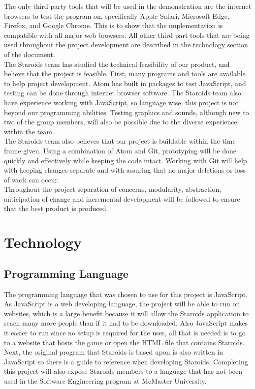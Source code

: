 \documentclass{article}
\begin{document}
The only third party tools that will be used in the demonstration are the internet browsers to test the program on, specifically Apple Safari, Microsoft Edge, Firefox, and Google Chrome. This is to show that the implementation is compatible with all major web browsers. All other third part tools that are being used throughout the project development are described in the \hyperref[technology:ide]{technology section} of the document.\\

The Staroids team has studied the technical feasibility of our product, and believe that the project is feasible. First, many programs and tools are available to help project development. Atom has built in packages to test JavaScript, and testing can be done through internet browser software. The Staroids team also have experience working with JavaScript, so language wise, this project is not beyond our programming abilities. Testing graphics and sounds, although new to two of the group members, will also be possible due to the diverse experience within the team.\\
The Staroids team also believes that our project is buildable within the time frame given. Using a combination of Atom and Git, prototyping will be done quickly and effectively while keeping the code intact. Working with Git will help with keeping changes separate and with assuring that no major deletions or loss of work can occur.\\
Throughout the project separation of concerns, modularity, abstraction, anticipation of change and incremental development will be followed to ensure that the best product is produced.

\section{Technology}
\subsection{Programming Language}
The programming language that was chosen to use for this project is JavaScript. As JavaScript is a web developing language, the project will be able to run on websites, which is a large benefit because it will allow the Staroids application to reach many more people than if it had to be downloaded. Also JavaScript makes it easier to run since no setup is required for the user, all that is needed is to go to a website that hosts the game or open the HTML file that contains Staroids. Next, the original program that Staroids is based upon is also written in JavaScript so there is a guide to reference when developing Staroids. Completing this project will also expose Staroids members to a language that has not been used in the Software Engineering program at McMaster University.
\end{document}
